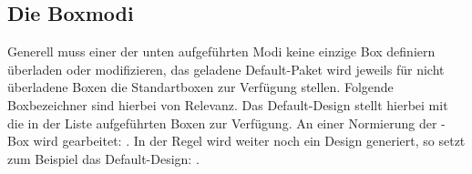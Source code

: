 \subsection{Die Boxmodi}
Generell muss einer der unten aufgeführten Modi keine einzige Box definiern überladen oder modifizieren, das geladene Default-Paket wird jeweils für nicht überladene Boxen die Standartboxen zur Verfügung stellen. Folgende Boxbezeichner sind hierbei von Relevanz. Das Default-Design stellt hierbei mit  die in der Liste  aufgeführten Boxen zur Verfügung. An einer Normierung der -Box wird gearbeitet: %
\getRegisteredBoxes%
\def\mergel#1{\T{LILLYxBOXx#1}}. In der Regel wird weiter noch ein Design generiert, so setzt zum Beispiel das Default-Design: .

